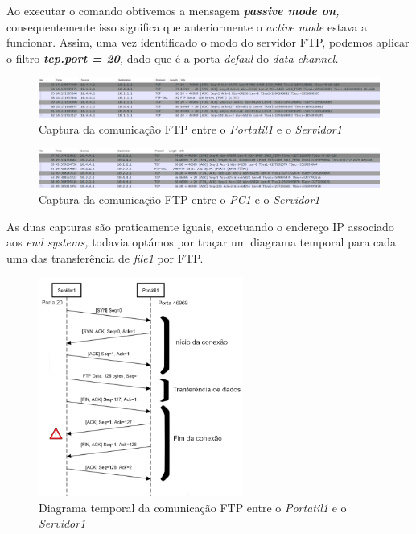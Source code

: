         Ao executar o comando obtivemos a mensagem \textit{\textbf{passive mode on},} consequentemente isso significa que anteriormente o \textit{active mode} estava a funcionar. Assim, uma vez identificado o modo do servidor FTP, podemos aplicar o filtro \textit{\textbf{tcp.port = 20},} dado que é a porta \textit{defaul} do \textit{data channel.}

        \begin{figure}[hb!]
            \centering
            \includegraphics[width=\textwidth]{Imagens/3.png}
            \caption{Captura da comunicação FTP entre o \textit{Portatil1} e o \textit{Servidor1}}
            \vspace{-10pt}
        \end{figure}

        \begin{figure}[hb!]
            \centering
            \includegraphics[width=\textwidth]{Imagens/4.png}
            \caption{Captura da comunicação FTP entre o \textit{PC1} e o \textit{Servidor1}}
            \vspace{-10pt}
        \end{figure}

        As duas capturas são praticamente iguais, excetuando o endereço IP associado aos \textit{end systems,} todavia optámos por traçar um diagrama temporal para cada uma das transferência de \textit{file1} por FTP. 

        \newpage

        \begin{figure}[hb!]
            \centering
            \includegraphics[width=0.6\textwidth]{Imagens/5.png}
            \caption{Diagrama temporal da comunicação FTP entre o \textit{Portatil1} e o \textit{Servidor1}}
            \vspace{-10pt}
        \end{figure}

